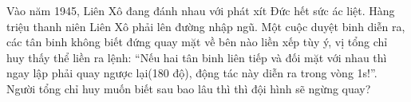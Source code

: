 Vào năm 1945, Liên Xô đang đánh nhau với phát xít Đức hết sức ác liệt. Hàng triệu thanh niên Liên Xô phải lên đường nhập ngũ. Một cuộc duyệt binh diễn ra, các tân binh không biết đứng quay mặt về bên nào liền xếp tùy ý, vị tổng chỉ huy thấy thể liền ra lệnh: “Nếu hai tân binh liên tiếp và đối mặt với nhau thì ngay lập phải quay ngược lại(180 độ), động tác này diễn ra trong vòng 1s!”. Người tổng chỉ huy muốn biết sau bao lâu thì thì đội hình sẽ ngừng quay?  

\